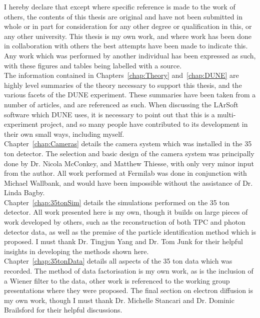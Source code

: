 
\begin{declaration}

  I hereby declare that except where specific reference is made to the work of others, the contents of this thesis are original and have not been submitted in whole or in part for consideration for any other degree or qualification in this, or any other university. This thesis is my own work, and where work has been done in collaboration with others the best attempts have been made to indicate this. Any work which was performed by another individual has been expressed as such, with these figures and tables being labelled with a source. \\

  The information contained in Chapters~\ref{chap:Theory} and~\ref{chap:DUNE} are highly level summaries of the theory necessary to support this thesis, and the various facets of the DUNE experiment. These summaries have been taken from a number of articles, and are referenced as such. When discussing the LArSoft software which DUNE uses, it is necessary to point out that this is a multi-experiment project, and so many people have contributed to its development in their own small ways, including myself. \\

  Chapter~\ref{chap:Cameras} details the camera system which was installed in the 35 ton detector. The selection and basic design of the camera system was principally done by Dr. Nicola McConkey, and Matthew Thiesse, with only very minor input from the author. All work performed at Fermilab was done in conjunction with Michael Wallbank, and would have been impossible without the assistance of Dr. Linda Bagby. \\

  Chapter~\ref{chap:35tonSim} details the simulations performed on the 35 ton detector. All work presented here is my own, though it builds on large pieces of work developed by others, such as the reconstruction of both TPC and photon detector data, as well as the premise of the particle identification method which is proposed. I must thank Dr. Tingjun Yang and Dr. Tom Junk for their helpful insights in developing the methods shown here. \\

  Chapter~\ref{chap:35tonData} details all aspects of the 35 ton data which was recorded. The method of data factorisation is my own work, as is the inclusion of a Wiener filter to the data, other work is referenced to the working group presentations where they were proposed. The final section on electron diffusion is my own work, though I must thank Dr. Michelle Stancari and Dr. Dominic Brailsford for their helpful discussions. \\


\end{declaration}
